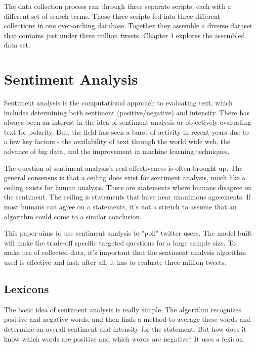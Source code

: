 \documentclass[11pt, twoside, reqno]{book}
\begin{document}
The data collection process ran through three separate scripts, each with a different set of search terms. Those three scripts fed into three different collections in one over-arching database. Together they assemble a diverse dataset that contains just under three million tweets. Chapter 4 explores the assembled data set.  


\chapter{Sentiment Analysis}
\label{ch:3}
\hspace{0.2in}Sentiment analysis is the computational approach to evaluating text, which includes determining both sentiment (positive/negative) and intensity\cite{vader}. There has always been an interest in the idea of sentiment analysis or objectively evaluating text for polarity. But, the field has seen a burst of activity in recent years due to a few key factors - the availability of text through the world wide web, the advance of big data, and the improvement in machine learning techniques. 

The question of sentiment analysis's real effectiveness is often brought up. The general consensus is that a ceiling does exist for sentiment analysis, much like a ceiling exists for human analysis. There are statements where humans disagree on the sentiment. The ceiling is statements that have near unanimous agreements. If most humans can agree on a statements, it's not a stretch to assume that an algorithm could come to a similar conclusion. 

This paper aims to use sentiment analysis to "poll" twitter users. The model built will make the trade-off specific targeted questions for a large sample size. To make use of collected data, it's important that the sentiment analysis algorithm used is effective and fast; after all, it has to evaluate three million tweets. 

\section{Lexicons}
\hspace{0.2in}The basic idea of sentiment analysis is really simple. The algorithm recognizes positive and negative words, and then finds a method to average these words and determine an overall sentiment and intensity for the statement. But how does it know which words are positive and which words are negative? It uses a lexicon. 
\end{document}
